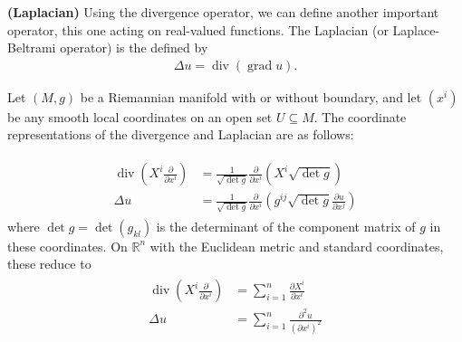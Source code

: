 \documentclass[12pt]{article} %
\newcommand{\bfs}[1]{\textbf{({#1}) }}
\begin{document}
\begin{defa}\bfs{Laplacian}
Using the divergence operator, we can define another important operator, this one acting on real-valued functions. The Laplacian (or Laplace-Beltrami operator) is the  defined by
\begin{align*}
\Delta u=\operatorname{div}(\operatorname{grad} u) .
\end{align*}
\end{defa}

\begin{lema}
 Let $(M, g)$ be a Riemannian manifold with or without boundary, and let $\left(x^{i}\right)$ be any smooth local coordinates on an open set $U \subseteq M$. The coordinate representations of the divergence and Laplacian are as follows:

\begin{align*}
\begin{aligned}
\operatorname{div}\left(X^{i} \frac{\partial}{\partial x^{i}}\right) &=\frac{1}{\sqrt{\operatorname{det} g}} \frac{\partial}{\partial x^{i}}\left(X^{i} \sqrt{\operatorname{det} g}\right) \\
\Delta u &=\frac{1}{\sqrt{\operatorname{det} g}} \frac{\partial}{\partial x^{i}}\left(g^{i j} \sqrt{\operatorname{det} g} \frac{\partial u}{\partial x^{j}}\right)
\end{aligned}
\end{align*}
where $\operatorname{det} g=\operatorname{det}\left(g_{k l}\right)$ is the determinant of the component matrix of $g$ in these coordinates. On $\mathbb{R}^{n}$ with the Euclidean metric and standard coordinates, these reduce to
\begin{align*}
\begin{aligned}
\operatorname{div}\left(X^{i} \frac{\partial}{\partial x^{i}}\right) &=\sum_{i=1}^{n} \frac{\partial X^{i}}{\partial x^{i}} \\
\Delta u &=\sum_{i=1}^{n} \frac{\partial^{2} u}{\left(\partial x^{i}\right)^{2}}
\end{aligned}
\end{align*}
\end{lema}
\end{document}
